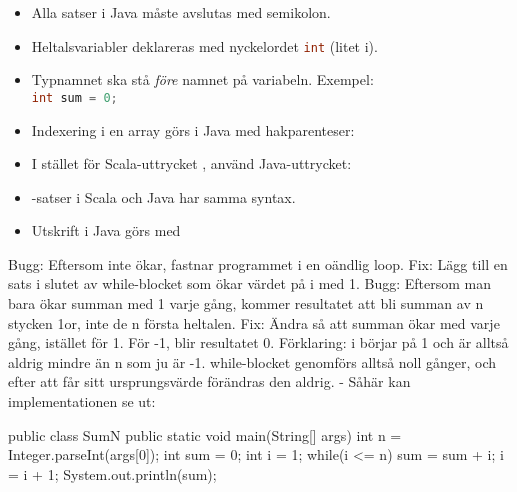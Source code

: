 \begin{itemize}[noitemsep, nolistsep]
\item Alla satser i Java måste avslutas med semikolon.
\item Heltalsvariabler deklareras med nyckelordet \lstinline[language=Java]{int} (litet i).
\item Typnamnet ska stå \emph{före} namnet på variabeln. Exempel: \\ \lstinline[language=Java]{int sum = 0;}
\item Indexering i en array görs i Java med hakparenteser: 
\item I stället för Scala-uttrycket , använd Java-uttrycket: \\ 
\item {}-satser i Scala och Java har samma syntax.
\item Utskrift i Java görs med 
\end{itemize}


\SOLUTION


\TaskSolved \what


\SubtaskSolved  Bugg: Eftersom  inte ökar, fastnar programmet i en oändlig loop. Fix: Lägg till en sats i slutet av while-blocket som ökar värdet på i med 1.
Bugg: Eftersom man bara ökar summan med 1 varje gång, kommer resultatet att bli summan av n stycken 1or, inte de n första heltalen. Fix: Ändra så att summan ökar med  varje gång, istället för 1.
För -1, blir resultatet 0. Förklaring: i börjar på 1 och är alltså aldrig mindre än n som ju är -1. while-blocket genomförs alltså noll gånger, och efter att  får sitt ursprungsvärde förändras den aldrig.
\SubtaskSolved  -
\SubtaskSolved  Såhär kan implementationen se ut:
\begin{Code}
public class SumN {
  public static void main(String[] args) {
    int n = Integer.parseInt(args[0]);
    int sum = 0;
    int i = 1;
    while(i <= n){
      sum = sum + i;
      i = i + 1;
      }
    }
    System.out.println(sum);
}
\end{Code}



\QUESTEND









